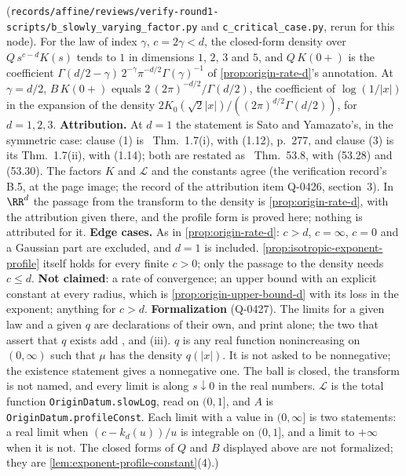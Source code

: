 \begin{proposition}
{(\texttt{records/affine/reviews/verify-round1-scripts/b\_slowly\_varying\_factor.py} and
\texttt{c\_critical\_case.py}, rerun for this node). For the \Matern{} law of index $\gamma$,
$c = 2\gamma < d$, the closed-form density over $Q\,s^{c-d}K(s)$ tends to $1$ in dimensions
$1$, $2$, $3$ and $5$, and $Q\,K(0{+})$ is the coefficient
$\Gamma(d/2 - \gamma)\,2^{-\gamma}\pi^{-d/2}\Gamma(\gamma)^{-1}$ of
\ref{prop:origin-rate-d}'s annotation. At $\gamma = d/2$, $B\,K(0{+})$ equals
$2\,(2\pi)^{-d/2}/\Gamma(d/2)$, the coefficient of $\log(1/|x|)$ in the expansion of the density
$2K_0(\sqrt2|x|)/((2\pi)^{d/2}\Gamma(d/2))$, for $d = 1, 2, 3$. \textbf{Attribution.} At $d = 1$
the statement is Sato and Yamazato's, in the symmetric case: clause (1) is
~Thm.~1.7(i), with (1.12), p.~277, and clause (3) is its
Thm.~1.7(ii), with (1.14); both are restated as ~Thm.~53.8, with (53.28) and
(53.30). The factors $K$ and $\mathcal{L}$ and the constants agree (the verification record's
B.5, at the page image; the record of the attribution item Q-0426, section~3). In $\RR^d$ the
passage from the transform to the density is \ref{prop:origin-rate-d}, with the attribution given
there, and the profile form is proved here; nothing is attributed for it. \textbf{Edge cases.} As in
\ref{prop:origin-rate-d}: $c > d$, $c = \infty$, $c = 0$ and a Gaussian part are excluded, and
$d = 1$ is included. \ref{prop:isotropic-exponent-profile} itself holds for every finite
$c > 0$; only the passage to the density needs $c \le d$. \textbf{Not claimed}: a rate of
convergence; an upper bound with an explicit constant at every radius, which is
\ref{prop:origin-upper-bound-d} with its loss in the exponent; anything for $c > d$.
\textbf{Formalization} (Q-0427). The limits for a given law and a given $q$ are declarations of
their own, and print  alone; the two that assert that $q$ exists add ,
 and (iii). $q$ is any real function nonincreasing on $(0,\infty)$ such
that $\mu$ has the density $q(|x|)$. It is not asked to be nonnegative; the existence statement
gives a nonnegative one. The ball is closed, the transform is not named, and every limit is
along $s \downarrow 0$ in the real numbers. $\mathcal{L}$ is the total function
\texttt{OriginDatum.slowLog}, read on $(0,1]$, and $A$ is \texttt{OriginDatum.profileConst}.
Each limit with a value in $(0,\infty]$ is two statements: a real limit when
$(c - k_d(u))/u$ is integrable on $(0,1]$, and a limit to $+\infty$ when it is not. The closed
forms of $Q$ and $B$ displayed above are not formalized; they are
\ref{lem:exponent-profile-constant}(4).)}
\end{proposition}

